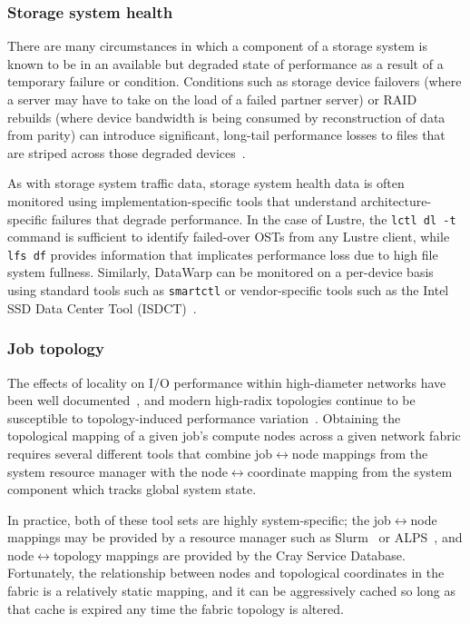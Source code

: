 \subsubsection{Storage system health}  \label{sec:architecture/components/fshealth}

There are many circumstances in which a component of a storage system is known to be in an available but degraded state of performance as a result of a temporary failure or condition.
Conditions such as storage device failovers (where a server may have to take on the load of a failed partner server) or RAID rebuilds (where device bandwidth is being consumed by reconstruction of data from parity) can introduce significant, long-tail performance losses to files that are striped across those degraded devices~\cite{Byna2013}.

As with storage system traffic data, storage system health data is often monitored using implementation-specific tools that understand architecture-specific failures that degrade performance.
In the case of Lustre, the \texttt{lctl dl -t} command is sufficient to identify failed-over OSTs from any Lustre client, while \texttt{lfs df} provides information that implicates performance loss due to high file system fullness.
Similarly, DataWarp can be monitored on a per-device basis using standard tools such as \texttt{smartctl} or vendor-specific tools such as the Intel SSD Data Center Tool (ISDCT)~\cite{isdct}.

\subsubsection{Job topology} \label{sec:architecture/components/topology}

The effects of locality on I/O performance within high-diameter networks have been well documented~\cite{Vishwanath2011,Bui2014,Dillow2011}, and modern high-radix topologies continue to be susceptible to topology-induced performance variation~\cite{Mubarak2017}.
Obtaining the topological mapping of a given job's compute nodes across a given network fabric requires several different tools that combine job$\leftrightarrow$node mappings from the system resource manager with the node$\leftrightarrow$coordinate mapping from the system component which tracks global system state.

In practice, both of these tool sets are highly system-specific; the job$\leftrightarrow$node mappings may be provided by a resource manager such as Slurm~\cite{Jacobsen2016} or ALPS~\cite{Karo2006}, and node$\leftrightarrow$topology mappings are provided by the Cray Service Database.
Fortunately, the relationship between nodes and topological coordinates in the fabric is a relatively static mapping, and it can be aggressively cached so long as that cache is expired any time the fabric topology is altered.

